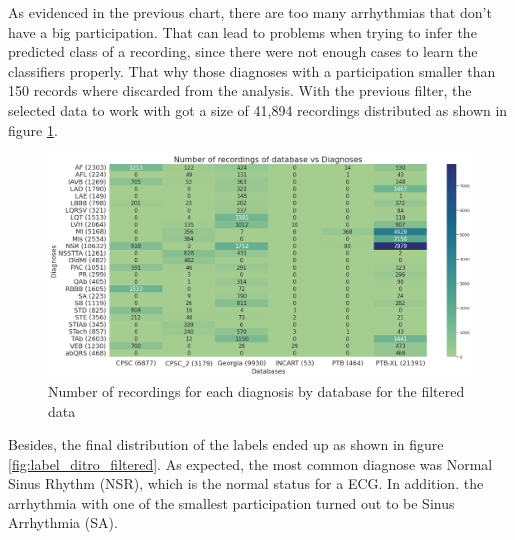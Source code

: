 As evidenced in the previous chart, there are too many arrhythmias that don't have a big participation. That can lead to problems when trying to infer the predicted class of a recording, since there were not enough cases to learn the classifiers properly. That why those diagnoses with a participation smaller than 150 records where discarded from the analysis. With the previous filter, the selected data to work with got a size of 41,894 recordings distributed as shown in figure \ref{fig:diagnose_count_by_db_filtered}.

\begin{figure}[H]
\centering
\includegraphics[scale=0.32]{img/diagnose_count_by_db_filtered.png}
\caption{Number of recordings for each diagnosis by database for the filtered data}
\label{fig:diagnose_count_by_db_filtered}
\end{figure}

Besides, the final distribution of the labels ended up as shown in figure \ref{fig:label_ditro_filtered}. As expected, the most common diagnose was Normal Sinus Rhythm (NSR), which is the normal status for a ECG. In addition. the arrhythmia with one of the smallest participation turned out to be Sinus Arrhythmia (SA).

